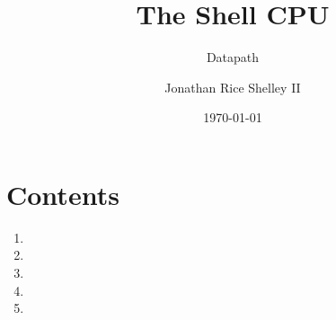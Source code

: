 \documentclass{article}
\subtitle{Datapath}
\title{The Shell CPU}
\author{Jonathan Rice Shelley II}
\date{\today}
\begin{document}
\maketitle

\section{Contents}
\begin{par}
	\begin{enumerate}
	\item {}
	\item {}
	\item {}
	\item {}
	\item {}
	\end{enumerate}
\end{par}
\end{document}
